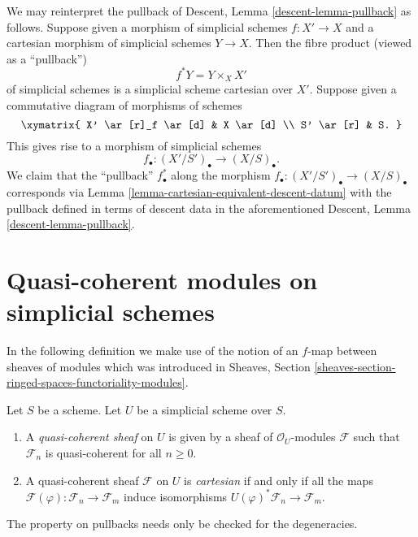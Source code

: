\noindent
We may reinterpret the pullback of
Descent, Lemma \ref{descent-lemma-pullback} as follows.
Suppose given a morphism of simplicial schemes $f : X' \to X$ and a
cartesian morphism of simplicial schemes $Y \to X$. Then
the fibre product (viewed as a ``pullback'')
$$
f^*Y = Y \times_X X'
$$
of simplicial schemes is a simplicial scheme cartesian over $X'$.
Suppose given a commutative diagram of morphisms of schemes
$$
\xymatrix{
X' \ar[r]_f \ar[d] & X \ar[d] \\
S' \ar[r] & S.
}
$$
This gives rise to a morphism of simplicial schemes
$$
f_\bullet : (X'/S')_\bullet \longrightarrow (X/S)_\bullet.
$$
We claim that the ``pullback'' $f_\bullet^*$ along the morphism
$f_\bullet : (X'/S')_\bullet \to (X/S)_\bullet$ corresponds via
Lemma \ref{lemma-cartesian-equivalent-descent-datum}
with the pullback defined in terms of descent data in
the aforementioned
Descent, Lemma \ref{descent-lemma-pullback}.







\section{Quasi-coherent modules on simplicial schemes}
\label{section-modules-simplicial}

\noindent
In the following definition we make use of the notion of an
$f$-map between sheaves of modules which was introduced in
Sheaves, Section \ref{sheaves-section-ringed-spaces-functoriality-modules}.

\begin{definition}
\label{definition-cartesian-sheaf}
Let $S$ be a scheme. Let $U$ be a simplicial scheme over $S$.
\begin{enumerate}
\item A {\it quasi-coherent sheaf} on $U$ is given by
a sheaf of $\mathcal{O}_U$-modules $\mathcal{F}$ such that
$\mathcal{F}_n$ is quasi-coherent for all $n \geq 0$.
\item A quasi-coherent sheaf $\mathcal{F}$ on $U$ is {\it cartesian}
if and only if all the maps
$\mathcal{F}(\varphi) : \mathcal{F}_n \to \mathcal{F}_m$
induce isomorphisms
$U(\varphi)^*\mathcal{F}_n \to \mathcal{F}_m$.
\end{enumerate}
\end{definition}

\noindent
The property on pullbacks needs only be checked for the degeneracies.

